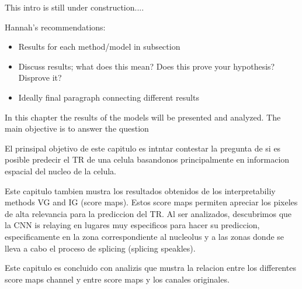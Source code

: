 
\glsresetall
\graphicspath{{./Sections/Results/Resources/}}

This intro is still under construction....

Hannah's recommendations:
\begin{itemize}
  \item Results for each method/model in subsection
  \item Discuss results; what does this mean? Does this prove your hypothesis? Disprove it?
  \item Ideally final paragraph connecting different results
\end{itemize}


In this chapter the results of the models will be presented and analyzed. The main objective is to answer the question

El prinsipal objetivo de este capitulo es intntar contestar la pregunta de si es posible predecir el TR de una celula basandonos principalmente en informacion espacial del nucleo de la celula.

Este capitulo tambien mustra los resultados obtenidos de los interpretabiliy methods VG and IG (score maps). Estos score maps permiten apreciar los pixeles de alta relevancia para la prediccion del TR. Al ser analizados, descubrimos que la CNN is relaying en lugares muy especificos para hacer su prediccion, especificamente en la zona correspondiente al nucleolus y a las zonas donde se lleva a cabo el proceso de splicing (splicing speakles).

Este capitulo es concluido con analizis que mustra la relacion entre los differentes score maps channel y entre score maps y los canales originales.

